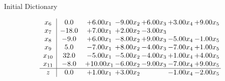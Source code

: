 \documentclass[8pt]{article}
\begin{document}
Initial Dictionary 

\[\begin{array}{c| c c@{\hskip 2pt} c@{\hskip 2pt} c@{\hskip 2pt} c@{\hskip 2pt} c@{\hskip 2pt} }
 x_{6}   &  0.0 & +  6.00 x_{1} & -9.00 x_{2} & +  6.00 x_{3} & +  3.00 x_{4} & +  9.00 x_{5}\\
 x_{7}   &  -18.0 & +  7.00 x_{1} & +  2.00 x_{2} & -3.00 x_{3} &    &   \\
 x_{8}   &  -9.0 & +  6.00 x_{1} & -8.00 x_{2} & +  9.00 x_{3} & -5.00 x_{4} & -1.00 x_{5}\\
 x_{9}   &  5.0 & -7.00 x_{1} & +  8.00 x_{2} & -4.00 x_{3} & -7.00 x_{4} & +  1.00 x_{5}\\
 x_{10}   &  32.0 & -5.00 x_{1} & -5.00 x_{2} & -4.00 x_{3} & +  1.00 x_{4} & +  4.00 x_{5}\\
 x_{11}   &  -8.0 & + 10.00 x_{1} & -6.00 x_{2} & -9.00 x_{3} & -7.00 x_{4} & +  9.00 x_{5}\\
\hline
z    &  0.0 & +  1.00 x_{1} & +  3.00 x_{2} &   & -1.00 x_{4} & -2.00 x_{5}\\
\end{array}\]
\end{document}
